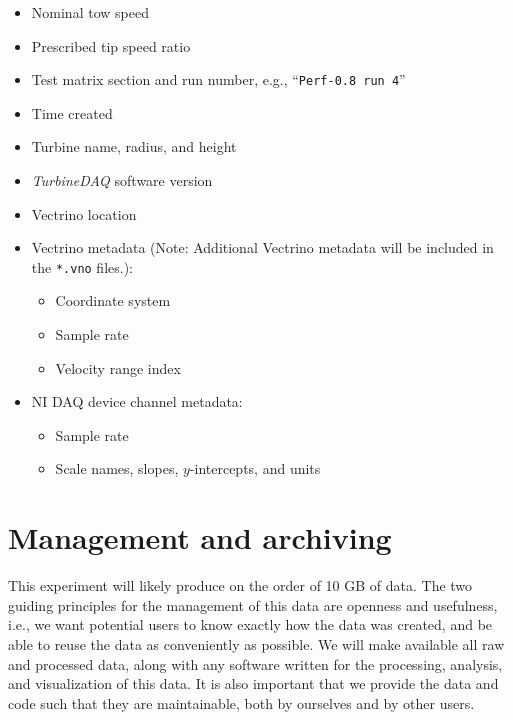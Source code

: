 \documentclass[12pt,letterpaper]{scrreprt}
\begin{document}
\begin{itemize}

	\item Nominal tow speed
	
	\item Prescribed tip speed ratio
	
	\item Test matrix section and run number, e.g., ``\texttt{Perf-0.8 run 4}''
	
	\item Time created
	
	\item Turbine name, radius, and height
	
	\item \textit{TurbineDAQ} software version
	
	\item Vectrino location
	
	\item Vectrino metadata (Note: Additional Vectrino metadata will be included in
	the \texttt{*.vno} files.):
	
		\begin{itemize}
		
			\item Coordinate system
			
			\item Sample rate
			
			\item Velocity range index
		
		\end{itemize}
		
	\item NI DAQ device channel metadata:
	
		\begin{itemize}
		
		\item Sample rate
		
		\item Scale names, slopes, $y$-intercepts, and units 
		
		\end{itemize}

\end{itemize}


\section{Management and archiving}

This experiment will likely produce on the order of 10 GB of data. The two
guiding principles for the management of this data are openness and usefulness,
i.e., we want potential users to know exactly how the data was created, and be
able to reuse the data as conveniently as possible. We will make available all
raw and processed data, along with any software written for the processing,
analysis, and visualization of this data. It is also important that we provide
the data and code such that they are maintainable, both by ourselves and by
other users.
\end{document}
